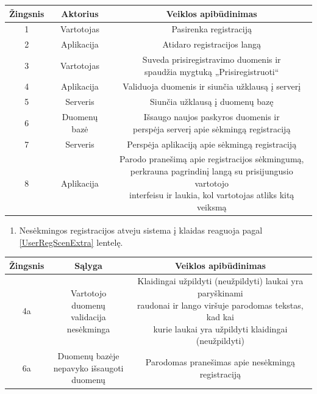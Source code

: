 \documentclass[12pt]{article}
\begin{document}
		\begin{center}
		\begin{tabular}{ | c | c | c | }
			\hline
			Žingsnis & Aktorius     & Veiklos apibūdinimas \\ \hline
			1        & Vartotojas   & Pasirenka registraciją \\ \hline
			2        & Aplikacija   & Atidaro registracijos langą \\ \hline
			3        & Vartotojas   & \makecell{Suveda prisiregistravimo duomenis ir \\ spaudžia mygtuką „Prisiregistruoti“} \\ \hline
			4        & Aplikacija   & Validuoja duomenis ir siunčia užklausą į serverį \\ \hline
			5        & Serveris     & Siunčia užklausą į duomenų bazę \\ \hline
			6        & Duomenų bazė & \makecell{Išsaugo naujos paskyros duomenis ir \\ perspėja serverį apie sėkmingą registraciją} \\ \hline
			7        & Serveris     & Perspėja aplikaciją apie sėkmingą registraciją \\ \hline
			8        & Aplikacija   & \makecell{Parodo pranešimą apie registracijos sėkmingumą, \\ perkrauna pagrindinį langą su prisijungusio vartotojo \\ interfeisu ir laukia, kol vartotojas atliks kitą veiksmą} \\ \hline
		\end{tabular}
		\end{center}
		\bigskip
		
	\begin{enumerate}[resume, labelindent=10pt,leftmargin=2.2cm]
		\item Nesėkmingos registracijos atveju sistema į klaidas reaguoja pagal \ref{UserRegScenExtra} lentelę.
	\end{enumerate}
		
		\begin{center}
		\begin{tabular}{ | c | c | c | }
			\hline
			Žingsnis & Sąlyga & Veiklos apibūdinimas \\ \hline
			4a       & \makecell{Vartotojo duomenų \\ validacija nesėkminga} & \makecell{Klaidingai užpildyti (neužpildyti) laukai yra paryškinami \\ raudonai ir lango viršuje parodomas tekstas, kad kai \\ kurie laukai yra užpildyti klaidingai (neužpildyti)} \\ \hline
			6a       & \makecell{Duomenų bazėje \\ nepavyko išsaugoti \\ duomenų} & Parodomas pranešimas apie nesėkmingą registraciją \\ \hline
		\end{tabular}
		\end{center}
		\pagebreak
		
\end{document}
